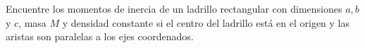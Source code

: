 \item Encuentre los momentos de inercia de un ladrillo rectangular con dimensiones $a, b$ y $c$, masa $M$ y densidad constante si el centro del ladrillo está en el origen y las aristas son paralelas a los ejes coordenados.
